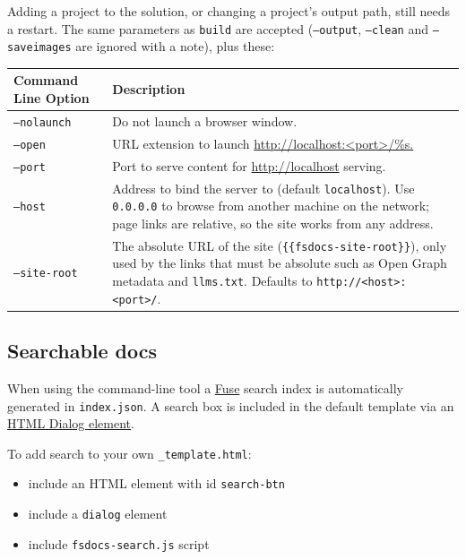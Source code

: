 \documentclass{article}
\begin{document}
Adding a project to the solution, or changing a project's output path, still needs a restart. The same
parameters as \texttt{build} are accepted
(\texttt{--output}, \texttt{--clean} and \texttt{--saveimages} are ignored with a note), plus these:
\begin{tabular}{|l|l|}\hline
\textbf{Command Line Option} & \textbf{Description}\\ \hline\hline
\texttt{--nolaunch} & Do not launch a browser window.\\ \hline
\texttt{--open} & URL extension to launch \href{http://localhost:<port>/\%s.}{http://localhost:<port>/\%s.}\\ \hline
\texttt{--port} & Port to serve content for \href{http://localhost}{http://localhost} serving.\\ \hline
\texttt{--host} & Address to bind the server to (default \texttt{localhost}). Use \texttt{0.0.0.0} to browse from another machine on the network; page links are relative, so the site works from any address.\\ \hline
\texttt{--site-root} & The absolute URL of the site (\texttt{\{\{fsdocs-site-root\}\}}), only used by the links that must be absolute such as Open Graph metadata and \texttt{llms.txt}. Defaults to \texttt{http://<host>:<port>/}.\\ \hline
\end{tabular}

\subsection*{Searchable docs}



When using the command-line tool a \href{https://www.fusejs.io/}{Fuse} search index is automatically generated in \texttt{index.json}.
A search box is included in the default template via an \href{https://developer.mozilla.org/docs/Web/HTML/Element/dialog}{HTML Dialog element}.

To add search to your own \texttt{\_template.html}:
\begin{itemize}
\item include an HTML element with id \texttt{search-btn}

\item include a \texttt{dialog} element

\item include \texttt{fsdocs-search.js} script

\end{itemize}
\end{document}
